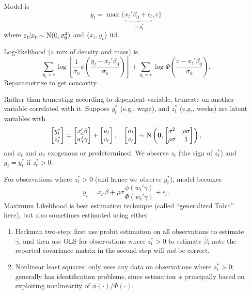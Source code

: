 \documentclass[8pt,letterpaper, landscape]{extarticle} %
\newcommand{\mzero}{\ensuremath{\mathbf{0}}}
\begin{document}
\begin{multicols}{3}
\begin{description}
Model is
\[ y_t = \max \{ \underbrace{x_{t}' \beta_0 + \epsilon_t}_{\equiv y_{t}^*} , c  \} \]
where $ \varepsilon_t | x_t \sim \operatorname{N} (0, \sigma_{0}^2) $ and $ \{x_t , y_t \} $ iid.

Log-likelihood (a mix of density and mass) is
\[ \sum_{y_t > c} \log \left[ \frac{1}{\sigma_0} \phi \left( \frac{y_t - x_{t}' \beta_0}{\sigma_0}  \right)  \right] + \sum_{y_t = c} \log \Phi \left( \frac{c - x_{t}' \beta_0}{\sigma_0}  \right) . \]
Reparametrize to get concavity.

 Rather than truncating according to dependent variable, truncate on another variable correlated with it. Suppose $ y_{t}^* $ (e.g., wage), and $ z_{t}^* $ (e.g., weeks) are latent variables with
\[ \begin{bmatrix} y_{t}^* \\ z_{t}^* \end{bmatrix}
=
\begin{bmatrix} x_{t}' \beta \\ w_{t}' \gamma \end{bmatrix}
+
\begin{bmatrix} u_t \\ v_t  \end{bmatrix}, \quad
\begin{bmatrix} u_t \\ v_t  \end{bmatrix} \sim \n \left( \mzero , 
\begin{bmatrix} \sigma^2 & \rho \sigma \\  \rho \sigma & 1 \end{bmatrix} \right),
 \]
and $ x_t $ and $ w_t $ exogenous or predetermined. We observe $ z_t $ (the sign of $ z_t^* $) and $ y_t = y_{t}^* $ if $ z_{t}^* > 0 $.

For observations where $ z_{t}^* > 0 $ (and hence we observe $ y_{t}^*  $), model becomes
\[ y_t = x_{t'}\beta + \rho \sigma \frac{\phi (w_{t}' \gamma)}{\Phi (w_{t}' \gamma)} + \epsilon_t . \]
Maximum Likelihood is best estimation technique (called ``generalized Tobit'' here), but also sometimes estimated using either
\begin{enumerate}
\item Heckman two-step: first use probit estimation on all observations to estimate $ \hat{\gamma} $, and then use OLS for observations where $ z_{t}^* > 0 $ to estimate $ \hat{\beta} $; note the reported covariance matrix in the second step will \textit{not} be correct.
\item Nonlinear least squares: only uses any data on observations where $ z_{t}^* > 0 $; generally has identification problems, since estimation is principally based on exploiting nonlinearity of $ \phi (\cdot) / \Phi (\cdot) $.
\end{enumerate}


\end{description}
\end{multicols}
\end{document}
